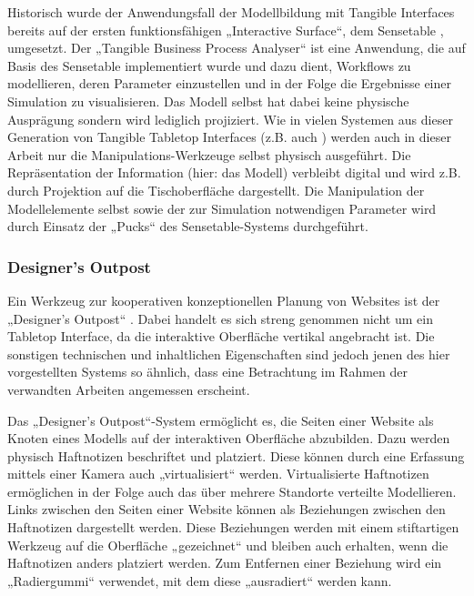 Historisch wurde der Anwendungsfall der Modellbildung mit Tangible Interfaces bereits auf der ersten funktionsfähigen „Interactive Surface“, dem Sensetable \citep{Patten01}, umgesetzt. Der „Tangible Business Process Analyser“ \citep{Mori04} ist eine Anwendung, die auf Basis des Sensetable implementiert wurde und dazu dient, Workflows zu modellieren, deren Parameter einzustellen und in der Folge die Ergebnisse einer Simulation zu visualisieren. Das Modell selbst hat dabei keine physische Ausprägung sondern wird lediglich projiziert. Wie in vielen Systemen aus dieser Generation von Tangible Tabletop Interfaces (z.B. auch \citep{Fitzmaurice95}) werden auch in dieser Arbeit nur die Manipulations-Werkzeuge selbst physisch ausgeführt. Die Repräsentation der Information (hier: das Modell) verbleibt digital und wird z.B. durch Projektion auf die Tischoberfläche dargestellt. Die Manipulation der Modellelemente selbst sowie der zur Simulation notwendigen Parameter wird durch Einsatz der „Pucks“ des Sensetable-Systems durchgeführt.

\subsubsection{Designer's Outpost} %
\label{ssub:designer_s_outpost}

Ein Werkzeug zur kooperativen konzeptionellen Planung von Websites ist der „Designer's Outpost“ \citep{Klemmer01}. Dabei handelt es sich streng genommen nicht um ein Tabletop Interface, da die interaktive Oberfläche vertikal angebracht ist. Die sonstigen technischen und inhaltlichen Eigenschaften sind jedoch jenen des hier vorgestellten Systems so ähnlich, dass eine Betrachtung im Rahmen der verwandten Arbeiten angemessen erscheint. 

Das „Designer's Outpost“-System ermöglicht es, die Seiten einer Website als Knoten eines Modells auf der interaktiven Oberfläche abzubilden. Dazu werden physisch Haftnotizen beschriftet und platziert. Diese können durch eine Erfassung mittels einer Kamera auch „virtualisiert“ werden. Virtualisierte Haftnotizen ermöglichen in der Folge auch das über mehrere Standorte verteilte Modellieren. Links zwischen den Seiten einer Website können als Beziehungen zwischen den Haftnotizen dargestellt werden. Diese Beziehungen werden mit einem stiftartigen Werkzeug auf die Oberfläche „gezeichnet“ und bleiben auch erhalten, wenn die Haftnotizen anders platziert werden. Zum Entfernen einer Beziehung wird ein „Radiergummi“ verwendet, mit dem diese „ausradiert“ werden kann.

